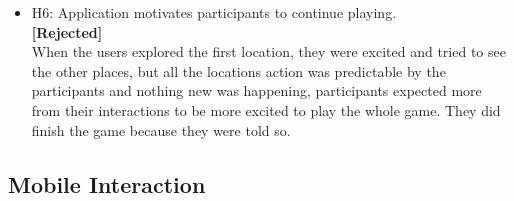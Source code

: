 \begin{itemize}
\item H6: Application motivates participants to continue playing. \\ 
\textbf{[Rejected]}\\
When the users explored the first location, they were excited and tried to see the other places, but all the locations action was predictable by the participants and nothing new was happening, participants expected more from their interactions to be more excited to play the whole game. They did finish the game because they were told so.

\end{itemize}


\subsection {Mobile Interaction}
